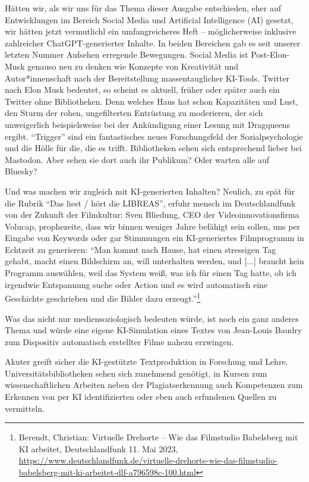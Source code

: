 \documentclass[a4paper,
fontsize=11pt,
oneside,
numbers=noperiodatend,
parskip=half-,
bibliography=totoc,
final
]{scrartcl}
\begin{document}
Hätten wir, als wir uns für das Thema dieser Ausgabe entschieden, eher
auf Entwicklungen im Bereich Social Media und Artificial Intelligence
(AI) gesetzt, wir hätten jetzt vermutlichl ein umfangreicheres Heft --
möglicherweise inklusive zahlreicher ChatGPT-generierter Inhalte. In
beiden Bereichen gab es seit unserer letzten Nummer Aufsehen erregende
Bewegungen. Social Media ist Post-Elon-Musk genauso neu zu denken wie
Konzepte von Kreativität und Autor*innenschaft nach der Bereitstellung
massentauglicher KI-Tools. Twitter nach Elon Musk bedeutet, so scheint
es aktuell, früher oder später auch ein Twitter ohne Bibliotheken. Denn
welches Haus hat schon Kapazitäten und Lust, den Sturm der rohen,
ungefilterten Entrüstung zu moderieren, der sich unweigerlich
beispielsweise bei der Ankündigung einer Lesung mit Dragqueens ergibt.
\enquote{Trigger} sind ein fantastisches neues Forschungsfeld der
Sozialpsychologie und die Hölle für die, die es trifft. Bibliotheken
sehen sich entsprechend lieber bei Mastodon. Aber sehen sie dort auch
ihr Publikum? Oder warten alle auf Bluesky?

Und was machen wir zugleich mit KI-generierten Inhalten? Neulich, zu
spät für die Rubrik \enquote{Das liest / hört die LIBREAS}, erfuhr
mensch im Deutschlandfunk von der Zukunft der Filmkultur: Sven Bliedung,
CEO der Videoinnovationsfirma Volucap, prophezeite, dass wir binnen
weniger Jahre befähigt sein sollen, uns per Eingabe von Keywords oder
gar Stimmungen ein KI-generiertes Filmprogramm in Echtzeit zu
generieren: \enquote{Man kommt nach Hause, hat einen stressigen Tag
gehabt, macht einen Bildschirm an, will unterhalten werden, und
{[}...{]} braucht kein Programm auswählen, weil das System weiß, was ich
für einen Tag hatte, ob ich irgendwie Entspannung suche oder Action und
es wird automatisch eine Geschichte geschrieben und die Bilder dazu
erzeugt.}\footnote{Berendt, Christian: Virtuelle Drehorte -- Wie das
  Filmstudio Babelsberg mit KI arbeitet, Deutschlandfunk 11. Mai 2023,
  \href{https://www.deutschlandfunk.de/virtuelle-drehorte-wie-das-filmstudio-babelsberg-mit-ki-arbeitet-dlf-a796598c-100.html}{https://www.deutschlandfunk.de/virtuelle-drehorte-wie-das-filmstudio-babelsberg-mit-ki-arbeitet-dlf-a796598c-100.html}}

Was das nicht nur mediensoziologisch bedeuten würde, ist noch ein ganz
anderes Thema und würde eine eigene KI-Simulation eines Textes von
Jean-Louis Baudry zum Dispositiv automatisch erstellter Filme nahezu
erzwingen.

Akuter greift sicher die KI-gestützte Textproduktion in Forschung und
Lehre. Universitätsbibliotheken sehen sich zunehmend genötigt, in Kursen
zum wissenschaftlichen Arbeiten neben der Plagiatserkennung auch
Kompetenzen zum Erkennen von per KI identifizierten oder eben auch
erfundenen Quellen zu vermitteln.
\end{document}
